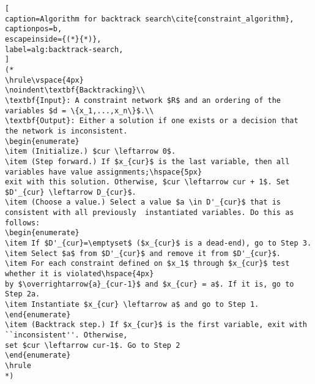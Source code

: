 \begin{lstlisting}[
caption=Algorithm for backtrack search\cite{constraint_algorithm}, 
captionpos=b, 
escapeinside={(*}{*)}, 
label=alg:backtrack-search,
]
(*
\hrule\vspace{4px}
\noindent\textbf{Backtracking}\\
\textbf{Input}: A constraint network $R$ and an ordering of the variables $d = \{x_1,...,x_n\}$.\\
\textbf{Output}: Either a solution if one exists or a decision that the network is inconsistent.
\begin{enumerate}
\item (Initialize.) $cur \leftarrow 0$.
\item (Step forward.) If $x_{cur}$ is the last variable, then all variables have value assignments;\hspace{5px}
exit with this solution. Otherwise, $cur \leftarrow cur + 1$. Set $D'_{cur} \leftarrow D_{cur}$.
\item (Choose a value.) Select a value $a \in D'_{cur}$ that is consistent with all previously  instantiated variables. Do this as follows:
\begin{enumerate} 
\item If $D'_{cur}=\emptyset$ ($x_{cur}$ is a dead-end), go to Step 3.
\item Select $a$ from $D'_{cur}$ and remove it from $D'_{cur}$.
\item For each constraint defined on $x_1$ through $x_{cur}$ test whether it is violated\hspace{4px}
by $\overrightarrow{a}_{cur-1}$ and $x_{cur} = a$. If it is, go to Step 2a.
\item Instantiate $x_{cur} \leftarrow a$ and go to Step 1.
\end{enumerate}
\item (Backtrack step.) If $x_{cur}$ is the first variable, exit with ``inconsistent''. Otherwise,
set $cur \leftarrow cur-1$. Go to Step 2
\end{enumerate}
\hrule
*)
\end{lstlisting}